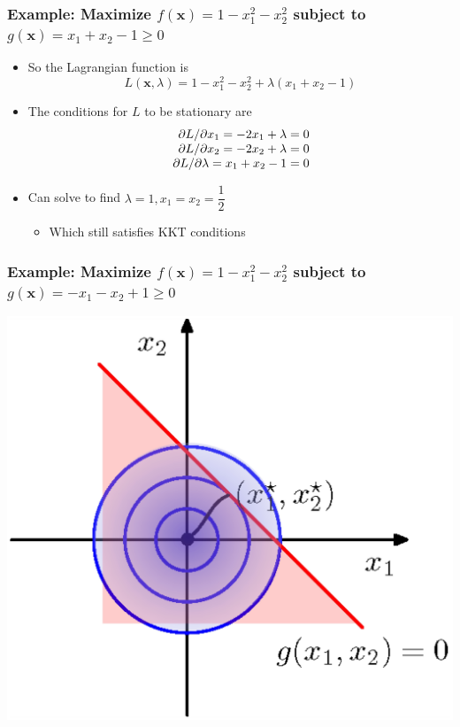\documentclass[12pt,notes,mathserif]{beamer}
\begin{document}
\begin{frame}[c]
\frametitle{Example: Maximize $f(\mathbf{x})=1-x_1^2-x_2^2$ subject to $g(\mathbf{x})=x_1+x_2-1\geqslant{}0$}
\begin{itemize}
\item So the Lagrangian function is 
\[
L(\mathbf{x},\lambda)=1-x_1^2-x_2^2+\lambda(x_1+x_2-1)
\]
\item The conditions for $L$ to be stationary are 
\[
\begin{array}{r@{~}l}
\partial L/\partial x_1=-2x_1+\lambda=0\\
\partial L/\partial x_2=-2x_2+\lambda=0\\
\partial L/\partial \lambda=x_1+x_2-1=0\\
\end{array}
\]
\item Can solve to find $\lambda=1,x_1=x_2=\dfrac{1}{2}$
\begin{itemize}
\item Which still satisfies KKT conditions
\end{itemize}
\end{itemize}
\end{frame}


\begin{frame}[c]
\frametitle{Example: Maximize $f(\mathbf{x})=1-x_1^2-x_2^2$ subject to $g(\mathbf{x})=-x_1-x_2+1\geqslant{}0$}
\begin{center}
\includegraphics[width=0.65\linewidth]{fig8/lec837.jpg}
\end{center}
\end{frame}
\end{document}
